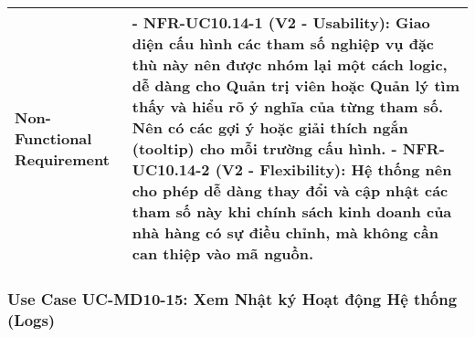 \begin{longtable}{|m{4cm}|p{11cm}|}
\hline
Non-Functional Requirement & - \textbf{NFR-UC10.14-1 (V2 - Usability):} Giao diện cấu hình các tham số nghiệp vụ đặc thù này nên được nhóm lại một cách logic, dễ dàng cho Quản trị viên hoặc Quản lý tìm thấy và hiểu rõ ý nghĩa của từng tham số. Nên có các gợi ý hoặc giải thích ngắn (tooltip) cho mỗi trường cấu hình. \newline - \textbf{NFR-UC10.14-2 (V2 - Flexibility):} Hệ thống nên cho phép dễ dàng thay đổi và cập nhật các tham số này khi chính sách kinh doanh của nhà hàng có sự điều chỉnh, mà không cần can thiệp vào mã nguồn. \\
\hline
\end{longtable}

\subsubsection{Use Case UC-MD10-15: Xem Nhật ký Hoạt động Hệ thống (Logs)}
